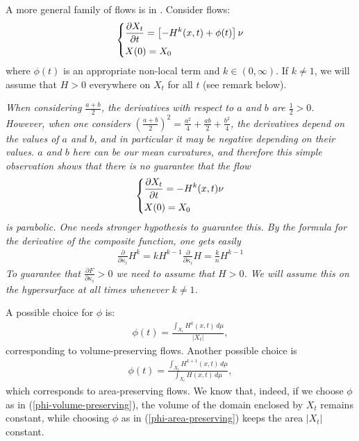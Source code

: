 A more general family of flows is in \cite{calcvar15}. Consider flows: 
\begin{align}
	\begin{dcases}
		\frac{\partial X_t}{\partial t} = \left[- H^k(x, t) + \phi(t)\right] \nu\\
		X(0)= X_0
	\end{dcases} \label{chapter 4 equation}
\end{align}
where $\phi(t)$ is an appropriate non-local term and $k\in (0, \infty)$. If $k\neq 1$, we will assume that  $H>0$ everywhere on $X_t$ for all $t$ (see remark below). 
\begin{oss}\em
	When considering $\frac{a+b}{2}$, the derivatives with respect to $a$ and $b$ are $\frac{1}{2}>0$. However, when one considers $ \left(\frac{a+b}{2}\right)^2=\frac{a^2}{4} + \frac{ab}{2} +\frac{b^2}{4} $,
	the derivatives depend on the values of $a$ and $b$, and in particular it may be negative depending on their values. $a$ and $b$ here can be our mean curvatures, and therefore this simple observation shows that there is no guarantee that the flow 
	\begin{align*}
		\begin{dcases}
			\frac{\partial X_t}{\partial t} = - H^k(x, t)  \nu\\
			X(0)= X_0
		\end{dcases} 
	\end{align*}
	is parabolic. One needs stronger hypothesis to guarantee this. By the formula for the derivative of the composite function, one gets easily
	\begin{align*}
		\frac{\partial }{\partial \kappa_i}  H^k =  k H^{k-1} \frac{\partial }{\partial \kappa_i}  H = \frac{k}{n} H^{k-1}
	\end{align*}
	To guarantee that $\frac{\partial F}{\partial \kappa_i} > 0$ we need to assume that $H>0$. We will assume this on the hypersurface at all times whenever $k\neq 1$.
\end{oss}
A possible choice for $\phi$ is: 
\begin{align}
	\phi(t) = \frac{\int_{X_t} H^k(x, t) \, d\mu}{|X_t|}, \label{phi-volume-preserving}
\end{align}
corresponding to volume-preserving flows. Another possible choice is
\begin{align}
	\phi(t) = \frac{\int_{X_t} H^{k+1}(x, t) \, d\mu}{\int_{X_t} H(x, t) \, d\mu}, \label{phi-area-preserving}
\end{align}
which corresponds to area-preserving flows. We know that, indeed, if we choose $\phi$ as in (\ref{phi-volume-preserving}), the volume of the domain enclosed by $X_t$ remains constant, while choosing $\phi$ as in (\ref{phi-area-preserving}) keeps the area $|X_t|$ constant. 

